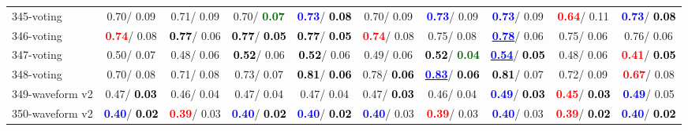\begin{table}[h]
\begin{center}
{\begin{tabular}{lc|c|c|c|c|c|c|c|c}
345-voting &   0.70/  0.09 &   0.71/  0.09 &   0.70/\textcolor{darkgreen}{\textbf{  0.07}} & \textcolor{blue}{\textbf{  0.73}}/\textcolor{black}{\textbf{  0.08}} &   0.70/  0.09 & \textcolor{blue}{\textbf{  0.73}}/  0.09 & \textcolor{blue}{\textbf{  0.73}}/  0.09 & \textcolor{red}{\textbf{  0.64}}/  0.11 & \textcolor{blue}{\textbf{  0.73}}/\textcolor{black}{\textbf{  0.08}} \\
346-voting & \textcolor{red}{\textbf{  0.74}}/  0.08 & \textcolor{black}{\textbf{  0.77}}/  0.06 & \textcolor{black}{\textbf{  0.77}}/\textcolor{black}{\textbf{  0.05}} & \textcolor{black}{\textbf{  0.77}}/\textcolor{black}{\textbf{  0.05}} & \textcolor{red}{\textbf{  0.74}}/  0.08 &   0.75/  0.08 & \underline{\textcolor{blue}{\textbf{  0.78}}}/  0.06 &   0.75/  0.06 &   0.76/  0.06 \\
347-voting &   0.50/  0.07 &   0.48/  0.06 & \textcolor{black}{\textbf{  0.52}}/  0.06 & \textcolor{black}{\textbf{  0.52}}/  0.06 &   0.49/  0.06 & \textcolor{black}{\textbf{  0.52}}/\textcolor{darkgreen}{\textbf{  0.04}} & \underline{\textcolor{blue}{\textbf{  0.54}}}/\textcolor{black}{\textbf{  0.05}} &   0.48/  0.06 & \textcolor{red}{\textbf{  0.41}}/\textcolor{black}{\textbf{  0.05}} \\
348-voting &   0.70/  0.08 &   0.71/  0.08 &   0.73/  0.07 & \textcolor{black}{\textbf{  0.81}}/\textcolor{black}{\textbf{  0.06}} &   0.78/\textcolor{black}{\textbf{  0.06}} & \underline{\textcolor{blue}{\textbf{  0.83}}}/\textcolor{black}{\textbf{  0.06}} & \textcolor{black}{\textbf{  0.81}}/  0.07 &   0.72/  0.09 & \textcolor{red}{\textbf{  0.67}}/  0.08 \\ \hline
349-waveform v2 &   0.47/\textcolor{black}{\textbf{  0.03}} &   0.46/  0.04 &   0.47/  0.04 &   0.47/  0.04 &   0.47/\textcolor{black}{\textbf{  0.03}} &   0.46/  0.04 & \textcolor{blue}{\textbf{  0.49}}/\textcolor{black}{\textbf{  0.03}} & \textcolor{red}{\textbf{  0.45}}/\textcolor{black}{\textbf{  0.03}} & \textcolor{blue}{\textbf{  0.49}}/  0.05 \\
350-waveform v2 & \textcolor{blue}{\textbf{  0.40}}/\textcolor{black}{\textbf{  0.02}} & \textcolor{red}{\textbf{  0.39}}/  0.03 & \textcolor{blue}{\textbf{  0.40}}/\textcolor{black}{\textbf{  0.02}} & \textcolor{blue}{\textbf{  0.40}}/\textcolor{black}{\textbf{  0.02}} & \textcolor{blue}{\textbf{  0.40}}/  0.03 & \textcolor{red}{\textbf{  0.39}}/  0.03 & \textcolor{blue}{\textbf{  0.40}}/  0.03 & \textcolor{red}{\textbf{  0.39}}/\textcolor{black}{\textbf{  0.02}} & \textcolor{blue}{\textbf{  0.40}}/\textcolor{black}{\textbf{  0.02}} \\

\end{tabular}}
\end{center}
\end{table}

